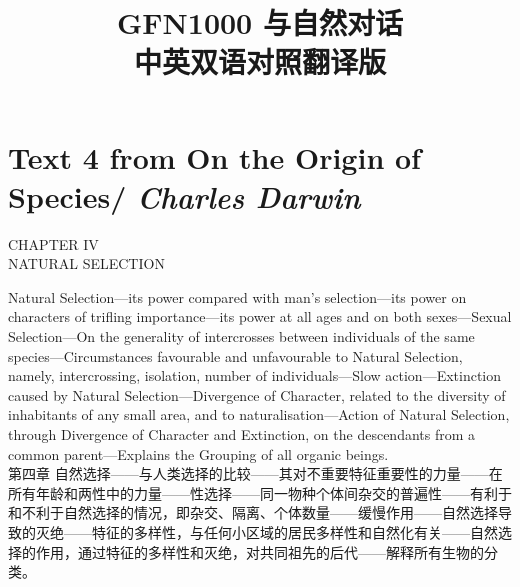\documentclass{article}
\begin{document}
\title{\textbf{
GFN1000 与自然对话\\
中英双语对照翻译版
}} %
\date{}
\maketitle %

\setcounter{secnumdepth}{0} %
\tableofcontents
\newpage
\section{Text 4 from On the Origin of Species/ \textit{Charles Darwin}}
\begin{center}
    CHAPTER IV\\
    NATURAL SELECTION
\end{center}

\addtolength{\leftskip}{1cm}
\addtolength{\rightskip}{1cm}

\noindent Natural Selection—its power compared with man's selection—its power on characters of trifling importance—its power at all ages and on both sexes—Sexual Selection—On the generality of intercrosses between individuals of the same species—Circumstances favourable and unfavourable to Natural Selection, namely, intercrossing, isolation, number of individuals—Slow action—Extinction caused by Natural Selection—Divergence of Character, related to the diversity of inhabitants of any small area, and to naturalisation—Action of Natural Selection, through Divergence of Character and Extinction, on the descendants from a common parent—Explains the Grouping of all organic beings.\\
第四章 自然选择——与人类选择的比较——其对不重要特征重要性的力量——在所有年龄和两性中的力量——性选择——同一物种个体间杂交的普遍性——有利于和不利于自然选择的情况，即杂交、隔离、个体数量——缓慢作用——自然选择导致的灭绝——特征的多样性，与任何小区域的居民多样性和自然化有关——自然选择的作用，通过特征的多样性和灭绝，对共同祖先的后代——解释所有生物的分类。\\

\addtolength{\leftskip}{-1cm}
\addtolength{\rightskip}{-1cm}
\end{document}
